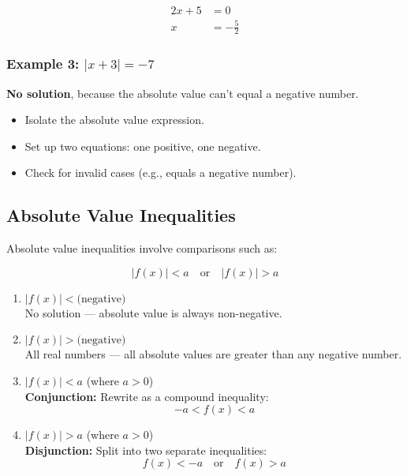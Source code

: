 \documentclass[11pt]{article}
\begin{document}
\begin{align*}
2x + 5 &= 0 \\
x &= -\frac{5}{2}
\end{align*}

\subsubsection*{Example 3: \( |x + 3| = -7 \)}

\textbf{No solution}, because the absolute value can’t equal a negative number.

\begin{tcolorbox}[colback=purple!5!white, colframe=purple!80!black, title=Summary]
\begin{itemize}
  \item Isolate the absolute value expression.
  \item Set up two equations: one positive, one negative.
  \item Check for invalid cases (e.g., equals a negative number).
\end{itemize}
\end{tcolorbox}

\subsection{Absolute Value Inequalities}

Absolute value inequalities involve comparisons such as:

\[
|f(x)| < a \quad \text{or} \quad |f(x)| > a
\]

\begin{tcolorbox}[colback=orange!5!white, colframe=orange!75!black, title=Key Cases]
\begin{enumerate}
  \item \textbf{\( |f(x)| < \text{(negative)} \)} \\
    \hspace{1em}No solution — absolute value is always non-negative.

  \item \textbf{\( |f(x)| > \text{(negative)} \)} \\
    \hspace{1em}All real numbers — all absolute values are greater than any negative number.

  \item \textbf{\( |f(x)| < a \)} (where \( a > 0 \)) \\
    \hspace{1em}\textbf{Conjunction:} Rewrite as a compound inequality:
    \[
    -a < f(x) < a
    \]

  \item \textbf{\( |f(x)| > a \)} (where \( a > 0 \)) \\
    \hspace{1em}\textbf{Disjunction:} Split into two separate inequalities:
    \[
    f(x) < -a \quad \text{or} \quad f(x) > a
    \]
\end{enumerate}
\end{tcolorbox}
\end{document}
